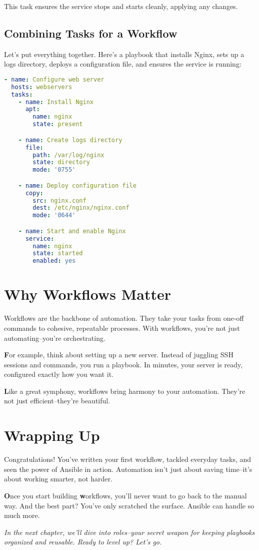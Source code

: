 This task ensures the service stops and starts cleanly, applying any changes.

\subsection{Combining Tasks for a Workflow}

Let's put everything together. Here's a playbook that installs Nginx, sets up a logs directory, deploys a configuration file, and ensures the service is running:
\begin{lstlisting}[language=yaml, caption=A Complete Workflow]
- name: Configure web server
  hosts: webservers
  tasks:
    - name: Install Nginx
      apt:
        name: nginx
        state: present

    - name: Create logs directory
      file:
        path: /var/log/nginx
        state: directory
        mode: '0755'

    - name: Deploy configuration file
      copy:
        src: nginx.conf
        dest: /etc/nginx/nginx.conf
        mode: '0644'

    - name: Start and enable Nginx
      service:
        name: nginx
        state: started
        enabled: yes
\end{lstlisting}

\section{Why Workflows Matter}

Workflows are the backbone of automation. They take your tasks from one-off commands to cohesive, repeatable processes. With workflows, you're not just automating--you're orchestrating.

\textbf{F}or example, think about setting up a new server. Instead of juggling SSH sessions and commands, you run a playbook. In minutes, your server is ready, configured exactly how you want it.


\textbf{L}ike a great symphony, workflows bring harmony to your automation. They're not just efficient--they're beautiful.

\section{Wrapping Up}

Congratulations! You've written your first workflow, tackled everyday tasks, and seen the power of Ansible in action. Automation isn't just about saving time--it's about working smarter, not harder.

\textbf{O}nce you start building \textbf{w}orkflows, you'll never want to go back to the manual way. And the best part? You've only scratched the surface. Ansible can handle so much more.

\vspace{1em}

\textit{In the next chapter, we'll dive into roles--your secret weapon for keeping playbooks organized and reusable. Ready to level up? Let's go.}
